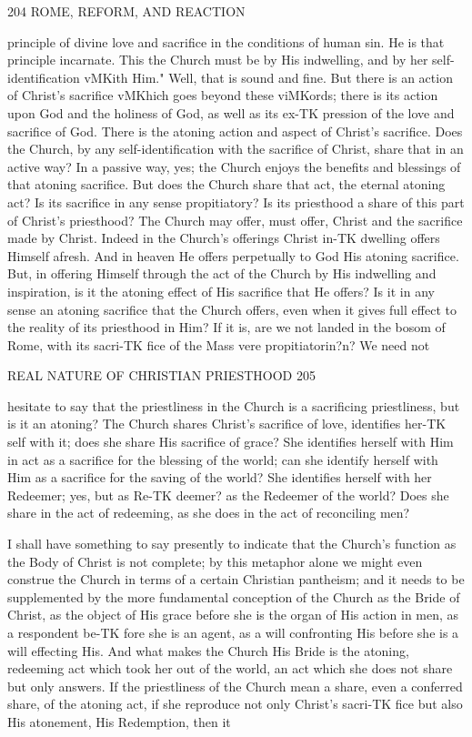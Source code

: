 \documentclass[12pt,a5paper,twoside]{book}
\begin{document}
{{204 ROME, REFORM, AND REACTION 

principle of divine love and sacrifice in the conditions 
of human sin. He is that principle incarnate. This 
the Church must be by His indwelling, and by her 
self-identification vMKith Him." Well, that is sound 
and fine. But there is an action of Christ's sacrifice 
vMKhich goes beyond these viMKords; there is its action 
upon God and the holiness of God, as well as its ex-TK
pression of the love and sacrifice of God. There is 
the atoning action and aspect of Christ's sacrifice. 
Does the Church, by any self-identification with the 
sacrifice of Christ, share that in an active way? In 
a passive way, yes; the Church enjoys the benefits and 
blessings of that atoning sacrifice. But does the 
Church share that act, the eternal atoning act? Is its 
sacrifice in any sense propitiatory? Is its priesthood a 
share of this part of Christ's priesthood? The Church 
may offer, must offer, Christ and the sacrifice made by 
Christ. Indeed in the Church's offerings Christ in-TK
dwelling offers Himself afresh. And in heaven He 
offers perpetually to God His atoning sacrifice. But, in 
offering Himself through the act of the Church by His 
indwelling and inspiration, is it the atoning effect of His 
sacrifice that He offers? Is it in any sense an atoning 
sacrifice that the Church offers, even when it gives full 
effect to the reality of its priesthood in Him? If it is, 
are we not landed in the bosom of Rome, with its sacri-TK
fice of the Mass vere propitiatorin?n? We need not 



REAL NATURE OF CHRISTIAN PRIESTHOOD 205 

hesitate to say that the priestliness in the Church is a 
sacrificing priestliness, but is it an atoning? The 
Church shares Christ's sacrifice of love, identifies her-TK
self with it; does she share His sacrifice of grace? 
She identifies herself with Him in act as a sacrifice for 
the blessing of the world; can she identify herself with 
Him as a sacrifice for the saving of the world? She 
identifies herself with her Redeemer; yes, but as Re-TK
deemer? as the Redeemer of the world? Does she 
share in the act of redeeming, as she does in the act 
of reconciling men? 

I shall have something to say presently to indicate 
that the Church's function as the Body of Christ is 
not complete; by this metaphor alone we might even 
construe the Church in terms of a certain Christian 
pantheism; and it needs to be supplemented by the 
more fundamental conception of the Church as the 
Bride of Christ, as the object of His grace before she 
is the organ of His action in men, as a respondent be-TK
fore she is an agent, as a will confronting His before 
she is a will effecting His. And what makes the 
Church His Bride is the atoning, redeeming act 
which took her out of the world, an act which she does 
not share but only answers. If the priestliness of the 
Church mean a share, even a conferred share, of the 
atoning act, if she reproduce not only Christ's sacri-TK
fice but also His atonement, His Redemption, then it 



}}
\end{document}
